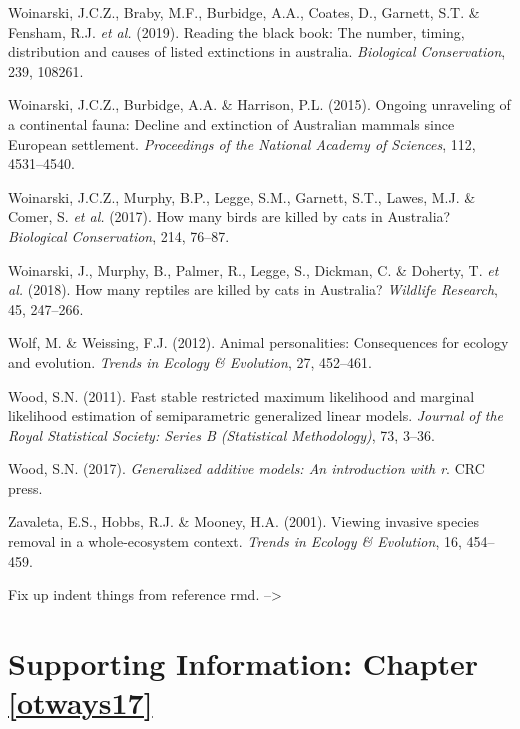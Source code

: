\documentclass[11pt,a4paper,titlepage,twoside,openright]{style/unimelbthesis}
\begin{document}
\begin{mainmatter}
\leavevmode\hypertarget{ref-woinarski2019reading}{}%
Woinarski, J.C.Z., Braby, M.F., Burbidge, A.A., Coates, D., Garnett, S.T. \& Fensham, R.J. \emph{et al.} (2019). Reading the black book: The number, timing, distribution and causes of listed extinctions in australia. \emph{Biological Conservation}, 239, 108261.

\leavevmode\hypertarget{ref-woinarski2015ongoing}{}%
Woinarski, J.C.Z., Burbidge, A.A. \& Harrison, P.L. (2015). Ongoing unraveling of a continental fauna: Decline and extinction of Australian mammals since European settlement. \emph{Proceedings of the National Academy of Sciences}, 112, 4531--4540.

\leavevmode\hypertarget{ref-woinarski2017birds}{}%
Woinarski, J.C.Z., Murphy, B.P., Legge, S.M., Garnett, S.T., Lawes, M.J. \& Comer, S. \emph{et al.} (2017). How many birds are killed by cats in Australia? \emph{Biological Conservation}, 214, 76--87.

\leavevmode\hypertarget{ref-woinarski2018reptiles}{}%
Woinarski, J., Murphy, B., Palmer, R., Legge, S., Dickman, C. \& Doherty, T. \emph{et al.} (2018). How many reptiles are killed by cats in Australia? \emph{Wildlife Research}, 45, 247--266.

\leavevmode\hypertarget{ref-wolf2012animal}{}%
Wolf, M. \& Weissing, F.J. (2012). Animal personalities: Consequences for ecology and evolution. \emph{Trends in Ecology \& Evolution}, 27, 452--461.

\leavevmode\hypertarget{ref-wood2011fast}{}%
Wood, S.N. (2011). Fast stable restricted maximum likelihood and marginal likelihood estimation of semiparametric generalized linear models. \emph{Journal of the Royal Statistical Society: Series B (Statistical Methodology)}, 73, 3--36.

\leavevmode\hypertarget{ref-wood2017generalized}{}%
Wood, S.N. (2017). \emph{Generalized additive models: An introduction with r}. CRC press.

\leavevmode\hypertarget{ref-zavaleta2001viewing}{}%
Zavaleta, E.S., Hobbs, R.J. \& Mooney, H.A. (2001). Viewing invasive species removal in a whole-ecosystem context. \emph{Trends in Ecology \& Evolution}, 16, 454--459.

\appendix

Fix up indent things from reference rmd.
--\textgreater{}
\setlength{\parindent}{0in}
\setlength{\leftskip}{0in}
\setlength{\parskip}{8pt}

\hypertarget{otways17-app}{%
\chapter{Supporting Information: Chapter \ref{otways17}}\label{otways17-app}}


\end{mainmatter}
\end{document}
